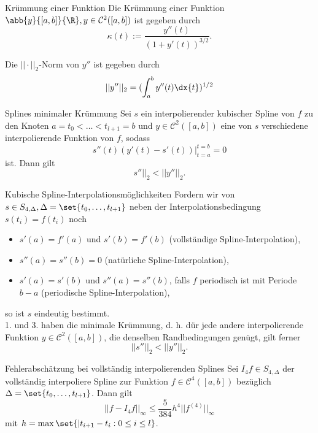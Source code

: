 \begin{karte}{Krümmung einer Funktion}
	Die Krümmung einer Funktion \( \abb{y}{[a,b]}{\R}, y\in \mathcal{C}^2([a,b]) \) 
	ist gegeben durch 
	\[ \kappa(t) := \frac{y''(t)}{ (1 + y'(t))^{3/2} }. \]

	Die \( ||\cdot ||_2 \)-Norm von \( y'' \) ist gegeben durch 
	\[ ||y''||_2 = (\int_a^b y''(t) \dx{t})^{1/2} \]
\end{karte}

\begin{karte}{Splines minimaler Krümmung}
	Sei \( s \) ein interpolierender kubischer Spline von 
	\(f\) zu den Knoten \( a = t_0 < \ldots < t_{l+1} = b \) und 
	\( y\in \mathcal{C}^2([a,b]) \) eine von \(s\) verschiedene 
	interpolierende Funktion von \(f\), sodass 
	\[ s''(t)(y'(t) - s'(t)) |_{t=a}^{t=b} = 0 \]
	ist. Dann gilt 
	\[ s''||_2 < ||y''||_2. \]
\end{karte}

\begin{karte}{Kubische Spline-Interpolationsmöglichkeiten}
	Fordern wir von \( s \in S_{4,\Delta}, \Delta = \set{t_0,\ldots, t_{l+1}} \) 
	neben der Interpolationsbedingung \( s(t_i) = f(t_i) \) noch 
	\begin{itemize}
		\item \( s'(a) = f'(a) \) und \( s'(b) = f'(b) \) (vollständige Spline-Interpolation),
		\item \( s''(a) = s''(b) = 0 \) (natürliche Spline-Interpolation), 
		\item \( s'(a) = s'(b) \) und \( s''(a) = s''(b) \), falls \(f\) periodisch ist mit Periode 
		\( b-a \) (periodische Spline-Interpolation),
	\end{itemize}
	so ist \(s\) eindeutig bestimmt. \\
	1. und 3. haben die minimale Krümmung, d. h. dür jede andere 
	interpolierende Funktion \( y \in \mathcal{C}^2([a,b]) \), die 
	denselben Randbedingungen genügt, gilt ferner 
	\[ ||s''||_2 < ||y''||_2. \]
\end{karte}

\begin{karte}{Fehlerabschätzung bei vollständig interpolierenden Splines}
	Sei \( I_4f \in S_{4,\Delta} \) der vollständig interpoliere Spline 
	zur Funktion \( f \in \mathcal{C}^4([a,b]) \) bezüglich 
	\( \Delta = \set{t_0, \ldots, t_{l+1}} \). Dann gilt 
	\[ || f - I_4f ||_\infty \leq \frac{5}{384}h^4 || f^{(4)}||_\infty \]
	mit \( h = \max\set{|t_{i+1} - t_i : 0 \leq i \leq l} \).
\end{karte}

